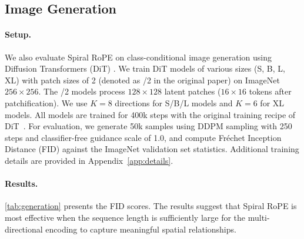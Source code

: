\subsection{Image Generation}

\paragraph{Setup.} We also evaluate Spiral RoPE on class-conditional image generation using Diffusion Transformers (DiT) \cite{peeblesScalableDiffusionModels2023}. We train DiT models of various sizes (S, B, L, XL) with patch sizes of 2 (denoted as /2 in the original paper) on ImageNet $256 \times 256$. The /2 models process $128 \times 128$ latent patches ($16 \times 16$ tokens after patchification). We use $K=8$ directions for S/B/L models and $K=6$ for XL models. All models are trained for 400k steps with the original training recipe of DiT~\cite{peeblesScalableDiffusionModels2023}. For evaluation, we generate 50k samples using DDPM sampling with 250 steps and classifier-free guidance scale of 1.0, and compute Fr\'{e}chet Inception Distance (FID) \cite{heuselGANsTrainedTwo2018} against the ImageNet validation set statistics. Additional training details are provided in Appendix~\ref{app:details}.

\paragraph{Results.} \cref{tab:generation} presents the FID scores. The results suggest that Spiral RoPE is most effective when the sequence length is sufficiently large for the multi-directional encoding to capture meaningful spatial relationships.

